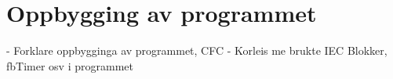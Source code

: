 \section{Oppbygging av programmet}
\thispagestyle{fancy}

- Forklare oppbygginga av programmet, CFC
- Korleis me brukte IEC Blokker, fbTimer osv i programmet
